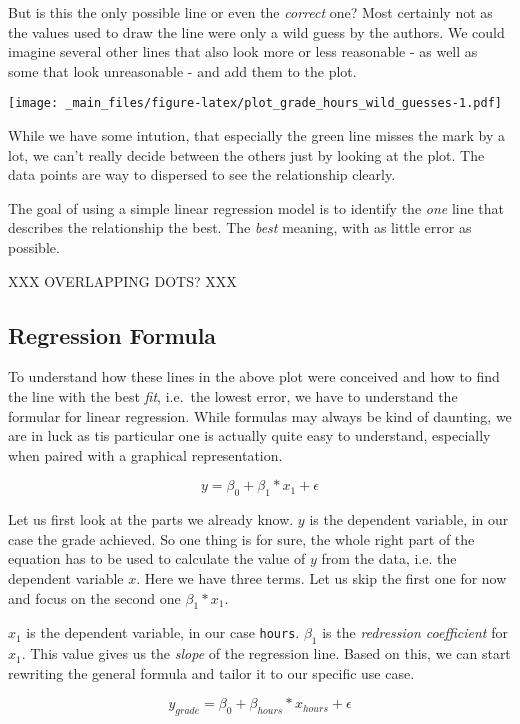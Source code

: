 \documentclass[
]{book}
\begin{document}
But is this the only possible line or even the \emph{correct} one? Most certainly not
as the values used to draw the line were only a wild guess by the authors. We
could imagine several other lines that also look more or less reasonable - as
well as some that look unreasonable - and add them to the plot.

\texttt{[image: \_main\_files/figure-latex/plot\_grade\_hours\_wild\_guesses-1.pdf]}

While we have some intution, that especially the green line misses the mark by a
lot, we can't really decide between the others just by looking at the plot. The
data points are way to dispersed to see the relationship clearly.

The goal of using a simple linear regression model is to identify the \emph{one} line
that describes the relationship the best. The \emph{best} meaning, with as little
error as possible.

XXX OVERLAPPING DOTS? XXX

\hypertarget{regression-formula}{%
\subsection{Regression Formula}\label{regression-formula}}

To understand how these lines in the above plot were conceived and how to find
the line with the best \emph{fit}, i.e.~the lowest error, we have to understand the
formular for linear regression. While formulas may always be kind of daunting,
we are in luck as tis particular one is actually quite easy to understand,
especially when paired with a graphical representation.

\[y = \beta_0 + \beta_1*x_1 + \epsilon\]

Let us first look at the parts we already know. \(y\) is the dependent variable,
in our case the grade achieved. So one thing is for sure, the whole right part
of the equation has to be used to calculate the value of \(y\) from the data, i.e.
the dependent variable \(x\). Here we have three terms. Let us skip the first one
for now and focus on the second one \(\beta_1*x_1\).

\(x_1\) is the dependent variable, in our case \texttt{hours}. \(\beta_1\) is the
\emph{redression coefficient} for \(x_1\). This value gives us the \emph{slope} of the
regression line. Based on this, we can start rewriting the general formula and
tailor it to our specific use case.

\[y_{grade} = \beta_0 + \beta_{hours}*x_{hours} + \epsilon\]
\end{document}
